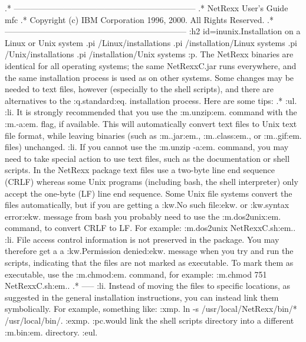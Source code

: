 .* ------------------------------------------------------------------
.* NetRexx User's Guide                                              mfc
.* Copyright (c) IBM Corporation 1996, 2000.  All Rights Reserved.
.* ------------------------------------------------------------------
:h2 id=inunix.Installation on a Linux or Unix system
.pi /Linux/installations
.pi /installation/Linux systems
.pi /Unix/installations
.pi /installation/Unix systems
:p.
The NetRexx binaries are identical for all operating systems; the same
NetRexxC.jar runs everywhere, and the same installation process is used
as on other systems.
Some changes may be needed to text files, however (especially to the
shell scripts), and there are alternatives to the :q.standard:eq.
installation process.  Here are some tips:
.*
:ul.
:li.
It is strongly recommended that you use the :m.unzip:em. command with
the :m.-a:em. flag, if available.  This will automatically convert text
files to Unix text file format, while leaving binaries (such
as :m..jar:em., :m..class:em., or :m..gif:em. files) unchanged.
:li.
If you cannot use the :m.unzip -a:em. command, you may need to take
special action to use text files, such as the documentation or shell
scripts.
In the NetRexx package text files use a two-byte line end sequence
(CRLF) whereas some Unix programs (including bash, the shell
interpreter) only accept the one-byte (LF) line end sequence.  Some Unix
file systems convert the files automatically, but if you are getting
a :kw.No such file:ekw. or :kw.syntax error:ekw. message from bash you
probably need to use the :m.dos2unix:em. command, to convert CRLF to LF.
For example: :m.dos2unix NetRexxC.sh:em..
:li.
File access control information is not preserved in the package.  You
may therefore get a a :kw.Permission denied:ekw. message when you try
and run the scripts, indicating that the files are not marked as
executable.
To mark them as executable, use the :m.chmod:em. command, for
example: :m.chmod 751 NetRexxC.sh:em..
.* -----
:li.
Instead of moving the files to specific locations, as suggested in the
general installation instructions, you can instead link them
symbolically.  For example, something like:
:xmp.
ln -s /usr/local/NetRexx/bin/* /usr/local/bin/.
:exmp.
:pc.would link the shell scripts directory into a different :m.bin:em.
directory.
:eul.
